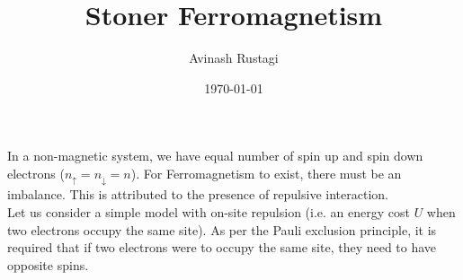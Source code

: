 \documentclass[aps,prb,onecolumn,notitlepage,showpacs,floatfix,superscriptaddress]{revtex4-1}
\begin{document}
\title{Stoner Ferromagnetism}

\author{Avinash Rustagi}
%
\date{\today}

\maketitle
%
In a non-magnetic system, we have equal number of spin up and spin down electrons ($n_{\uparrow}=n_{\downarrow}=n$). For Ferromagnetism to exist, there must be an imbalance. This is attributed to the presence of repulsive interaction.\\

Let us consider a simple model with on-site repulsion (i.e. an energy cost $U$ when two electrons occupy the same site). As per the Pauli exclusion principle, it is required that if two electrons were to occupy the same site, they need to have opposite spins. \\
\end{document}
